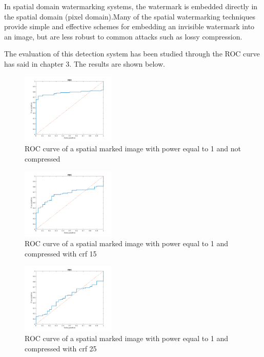 In spatial domain watermarking systems, the watermark is embedded directly in the spatial domain (pixel domain).\newline  Many of the spatial watermarking techniques provide simple and effective schemes for embedding an invisible watermark into an image, but are less robust to common attacks such as lossy compression.

The evaluation of this detection system has been studied through the ROC curve has said in chapter 3. The results are shown below.
\begin{figure}[h!]
\centering
\includegraphics[width=0.4\textwidth]{./img/ROC/ROC_gauss_1_1.png}
\caption{\small{ROC curve of a spatial marked image with power equal to 1 and not compressed}}
\label{fig:g1crf1}
\end{figure}
\begin{figure}[h!]
\centering
\includegraphics[width=0.4\textwidth]{./img/ROC/ROC_gauss_1_15.png}
\caption{\small{ROC curve of a spatial marked image with power equal to 1 and compressed with crf 15}}
\label{fig:g1crf15}
\end{figure}
\begin{figure}[h!]
\centering
\includegraphics[width=0.4\textwidth]{./img/ROC/ROC_gauss_1_25.png}
\caption{\small{ROC curve of a spatial marked image with power equal to 1 and compressed with crf 25}}
\label{fig:g1crf25}
\end{figure}
